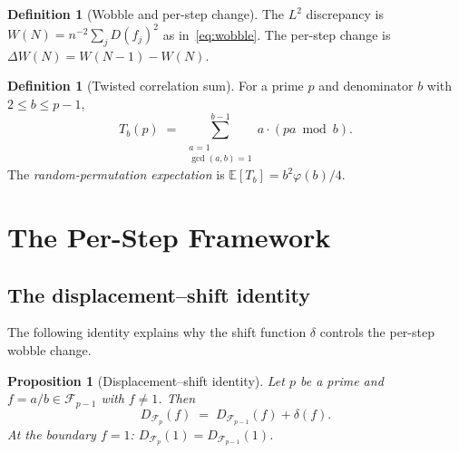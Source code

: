 \documentclass[11pt]{article}
\newtheorem{proposition}[theorem]{Proposition}
\theoremstyle{definition}
\newtheorem{definition}[theorem]{Definition}
\newcommand{\F}{\mathcal{F}}
\begin{document}
\begin{definition}[Wobble and per-step change]\label{def:wobble}
The $L^2$ discrepancy is $W(N) = n^{-2} \sum_{j} D(f_j)^2$ as
in~\eqref{eq:wobble}.  The per-step change is
$\Delta W(N) = W(N-1) - W(N)$.
\end{definition}

\begin{definition}[Twisted correlation sum]\label{def:twisted}
For a prime $p$ and denominator $b$ with $2 \le b \le p-1$,
\begin{equation}\label{eq:twisted-def}
  T_b(p) \;=\; \sum_{\substack{a=1 \\ \gcd(a,b)=1}}^{b-1}
    a \cdot (pa \bmod b).
\end{equation}
The \emph{random-permutation expectation} is
$\mathbb{E}[T_b] = b^2\varphi(b)/4$.
\end{definition}



\section{The Per-Step Framework}\label{sec:framework}

\subsection{The displacement--shift identity}\label{sec:disp-shift}

The following identity explains why the shift function $\delta$ controls
the per-step wobble change.

\begin{proposition}[Displacement--shift identity]\label{prop:disp-shift}
Let $p$ be a prime and $f = a/b \in \F_{p-1}$ with $f \ne 1$.
Then
\begin{equation}\label{eq:disp-shift}
  D_{\F_p}(f) \;=\; D_{\F_{p-1}}(f) + \delta(f).
\end{equation}
At the boundary $f = 1$: $D_{\F_p}(1) = D_{\F_{p-1}}(1)$.
\end{proposition}
\end{document}
